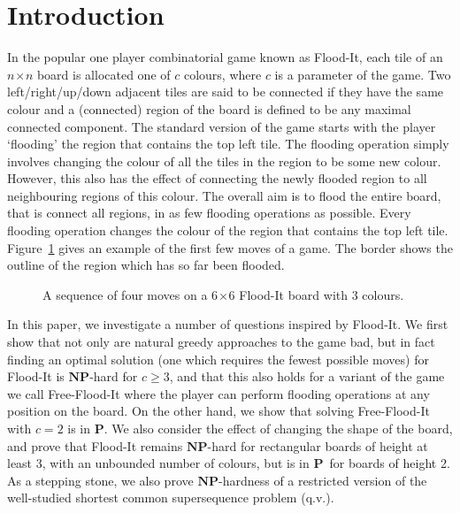 \documentclass[a4paper,11pt]{llncs}
\newcommand{\pgfgraphic}[1]{}
\newcounter{l}
\renewcommand{\geq}{\geqslant}
\newcommand{\Ptime}{\ensuremath{\mathbf{P}}}
\newcommand{\NPtime}{\ensuremath{\mathbf{NP}}}
\newcommand{\recdim}[2]{$#1$$\mspace{1mu}$$\times$$\mspace{1mu}$$#2$}
\begin{document}
\section{Introduction} \label{sec:intro}
In the popular one player combinatorial game known as Flood-It, each tile of an \recdim{n}{n} board is allocated one of $c$ colours, where $c$ is a parameter of the game.  Two left/right/up/down adjacent tiles are said to be connected if they have the same colour and a (connected) region of the board is defined to be any maximal connected component.   The standard version of the game starts with the player `flooding' the region that contains the top left tile. The flooding operation simply involves changing the colour of all the tiles in the region to be some new colour. However, this also has the effect of connecting the newly flooded region to all neighbouring regions of this colour.    The overall aim is to flood the entire board, that is connect all regions, in as few flooding operations as possible. Every flooding operation changes the colour of the region that contains the top left tile.  Figure~\ref{fig:turns} gives an example of the first few moves of a game. The border shows the outline of the region which has so far been flooded.
\begin{figure}[t]
    \centering
	\pgfgraphic{graphic-turns} \caption{A sequence of four moves on a \recdim{6}{6} Flood-It board with 3 colours. }
    \label{fig:turns}
\end{figure}

In this paper, we investigate a number of questions inspired by Flood-It. We first show that not only are natural greedy approaches to the game bad, but in fact finding an optimal solution (one which requires the fewest possible moves) for Flood-It is \NPtime-hard for $c \geq 3$, and that this also holds for a variant of the game we call Free-Flood-It where the player can perform flooding operations at any position on the board. On the other hand, we show that solving Free-Flood-It with $c=2$ is in \Ptime.  We also consider the effect of changing the shape of the board, and prove that Flood-It remains \NPtime-hard for rectangular boards of height at least 3, with an unbounded number of colours, but is in \Ptime\ for boards of height 2. As a stepping stone, we also prove \NPtime-hardness of a restricted version of the well-studied shortest common supersequence problem (q.v.).
\end{document}
